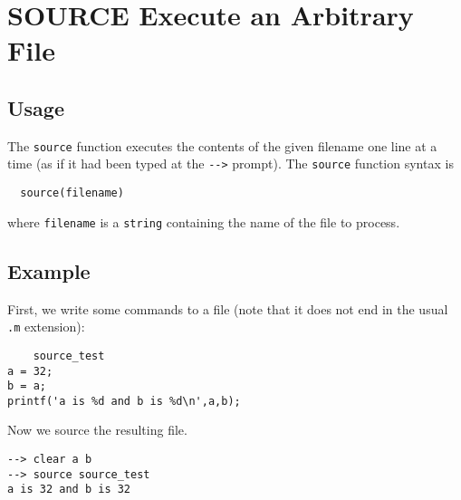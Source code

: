 \section{SOURCE Execute an Arbitrary File}

\subsection{Usage}

The \verb|source| function executes the contents of the given
filename one line at a time (as if it had been typed at
the \verb|-->| prompt).  The \verb|source| function syntax is
\begin{verbatim}
  source(filename)
\end{verbatim}
where \verb|filename| is a \verb|string| containing the name of
the file to process. 
\subsection{Example}

First, we write some commands to a file (note that it does
not end in the usual \verb|.m| extension):
\begin{verbatim}
    source_test
a = 32;
b = a;
printf('a is %d and b is %d\n',a,b);
\end{verbatim}
Now we source the resulting file.
\begin{verbatim}
--> clear a b
--> source source_test
a is 32 and b is 32
\end{verbatim}
